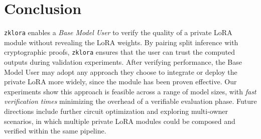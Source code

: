 \documentclass[11pt]{article}
\begin{document}
\section{Conclusion}
\texttt{zklora} enables a \emph{Base Model User} to verify the quality of a private LoRA module without revealing the LoRA weights. By pairing split inference with cryptographic proofs, \texttt{zklora} ensures that the user can trust the computed outputs during validation experiments. After verifying performance, the Base Model User may adopt any approach they choose to integrate or deploy the private LoRA more widely, since the module has been proven effective. Our experiments show this approach is feasible across a range of model sizes, with \emph{fast verification times} minimizing the overhead of a verifiable evaluation phase. Future directions include further circuit optimization and exploring multi-owner scenarios, in which multiple private LoRA modules could be composed and verified within the same pipeline.



\end{document}
